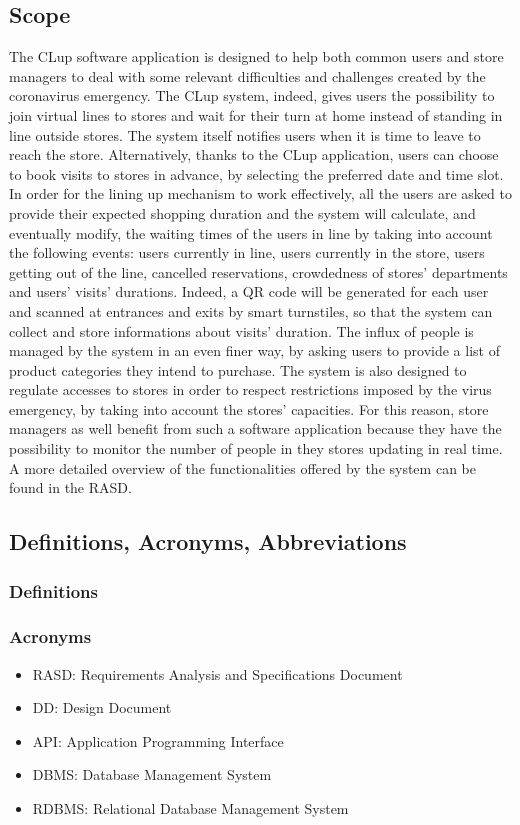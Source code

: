 \documentclass{article}
\begin{document}
\subsection{Scope}
The CLup software application is designed to help both common users and store managers to deal with some relevant difficulties and challenges created by the coronavirus emergency. The CLup system, indeed, gives users the possibility to join virtual lines to stores and wait for their turn at home instead of standing in line outside stores. The system itself notifies users when it is time to leave to reach the store. Alternatively, thanks to the CLup application, users can choose to book visits to stores in advance, by selecting the preferred date and time slot.
 In order for the lining up mechanism to work effectively, all the users are asked to provide their expected shopping duration and the system will calculate, and eventually modify, the waiting times of the users in line by taking into account the following events: users currently in line, users currently in the store, users getting out of the line, cancelled reservations, crowdedness of stores’ departments and users’ visits’ durations. Indeed, a QR code will be generated for each user and scanned at entrances and exits by smart turnstiles, so that the system can collect and store informations about visits’ duration. The influx of people is managed by the system in an even finer way, by asking users to provide a list of product categories they intend to purchase. The system is also designed to regulate accesses to stores in order to respect restrictions imposed by the virus emergency, by taking into account the stores’ capacities. For this reason, store managers as well benefit from such a software application because they have the possibility to monitor the number of people in they stores updating in real time.\\
A more detailed overview of the functionalities offered by the system can be found in the RASD.

\subsection{Definitions, Acronyms, Abbreviations}
\subsubsection{Definitions}
\subsubsection{Acronyms}
\begin{itemize}
\item RASD: Requirements Analysis and Specifications Document
\item DD: Design Document
\item API: Application Programming Interface
\item DBMS: Database Management System
\item RDBMS: Relational Database Management System
\end{itemize}
\end{document}
